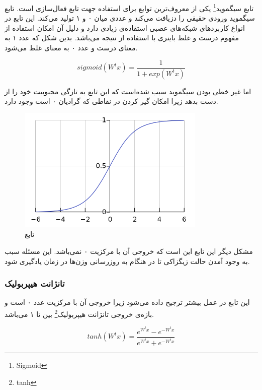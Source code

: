 \documentclass[12pt, a4paper, oneside]{report}
\begin{document}
تابع 
سیگموید\footnote{Sigmoid}
یکی از معروف‌ترین توابع برای استفاده جهت
تابع فعال‌سازی
‌است. تابع سیگموید ورودی حقیقی را دزیافت می‌کند و عددی میان ۰ و ۱ تولید می‌کند. این تابع در انواع کاربرد‌های شبکه‌‌های
عصبی استفاده‌ی زیادی دارد و دلیل آن امکان استفاده از مفهوم درست و غلط باینری با استفاده از نتیجه می‌باشد. بدین شکل که
عدد ۱ به معنای درست و عدد ۰ به معنای غلط می‌شود.

\begin{equation}
    sigmoid(W^tx) = \dfrac{1}{1 + exp(W^tx)}
\label{formula:sigmoid}
\end{equation}

اما غیر خطی بودن سیگموید
سبب شده‌است که این تابع به تازگی محبوبیت خود را از دست بدهد زیرا امکان گیر کردن در نقاطی که گرادیان ۰ است وجود دارد.

\begin{figure}[!ht]
    \centering
    \includegraphics[width=0.80\textwidth]{sigmoid}
    \caption{تابع }
    \label{fig:sigmoid}
\end{figure}

مشکل دیگر این تابع این است که خروجی آن با مرکزیت ۰ نمی‌باشد. این مسئله سبب به وجود آمدن حالت زیگزاکی
تا در هنگام به روزرسانی وزن‌ها در زمان یادگیری شود.

\subsubsection{تانژانت هیپربولیک}

این تابع در عمل بیشتر ترجیح داده می‌شود زیرا خروجی آن با مرکزیت عدد ۰ است و بازه‌ی خروجی
تانژانت هیپربولیک\footnote{tanh}
بین
تا ۱ می‌باشد.

\begin{equation}
    tanh(W^tx) = \dfrac{e^{W^tx} -e^{-W^tx}}{e^{W^tx} + e^{-W^tx}}
\label{formula:tanh}
\end{equation}
\end{document}
